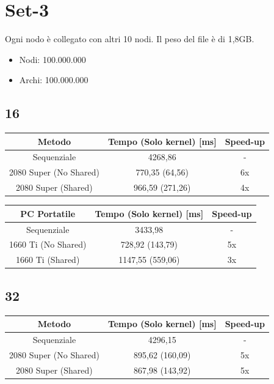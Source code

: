 \documentclass[12pt,a4paper]{report}
\begin{document}
		\section{Set-3}
		
			Ogni nodo è collegato con altri 10 nodi.
			Il peso del file è di 1,8GB.
		
			\begin{itemize}
				\item Nodi: 100.000.000
				\item Archi: 100.000.000
			\end{itemize}
	
			\subsection{16}
			
				\begin{tabular}{|c|c|c|}
					\hline
					Metodo & Tempo (Solo kernel) [ms] & Speed-up \\
					\hline
					Sequenziale & 4268,86 & -  \\
					\hline
					2080 Super (No Shared) & 770,35 (64,56) & 6x \\
					\hline
					2080 Super (Shared) & 966,59 (271,26) & 4x \\
					\hline
				\end{tabular}
				
				\bigbreak
				
				\begin{tabular}{|c|c|c|}
					\hline
					PC Portatile & Tempo (Solo kernel) [ms] & Speed-up \\
					\hline
					Sequenziale & 3433,98 & -  \\
					\hline
					1660 Ti (No Shared) & 728,92 (143,79) & 5x \\
					\hline
					1660 Ti (Shared) & 1147,55 (559,06) & 3x \\
					\hline
				\end{tabular}

			\subsection{32}
			
				\begin{tabular}{|c|c|c|}
					\hline
					Metodo & Tempo (Solo kernel) [ms] & Speed-up \\
					\hline
					Sequenziale & 4296,15 & -  \\
					\hline
					2080 Super (No Shared) & 895,62 (160,09) & 5x \\
					\hline
					2080 Super (Shared) & 867,98 (143,92) & 5x \\
					\hline
				\end{tabular}
				
\end{document}
